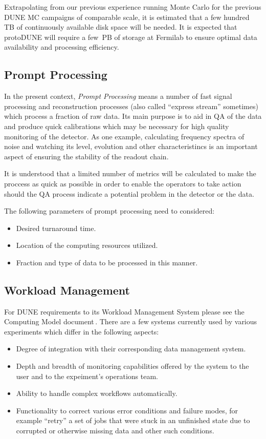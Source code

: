 Extrapolating from our previous experience running Monte Carlo for the previous DUNE MC campaigns of comparable scale,
it is estimated that  a few hundred TB of continuously available disk space will be needed. It is expected that protoDUNE will require
a few~PB of storage at Fermilab to ensure optimal data availability and  processing efficiency. 

\subsection{Prompt Processing}
\label{sec:prompt_processing}
In the present context, \textit{Prompt Processing} means a number of fast signal processing and reconstruction processes
(also called ``express stream'' sometimes) which process a fraction of raw data. Its main purpose is to aid in QA of the data
and produce quick calibrations which may be necessary for high quality monitoring of the detector. As one example,
calculating frequency spectra of noise and watching its level, evolution and other characteristincs is an important aspect of ensuring
the stability of the readout chain.

It is understood
that a limited number of metrics will be calculated to make the proccess as quick as possible in order to enable
the operators to take action should the QA process indicate a potential problem in the detector or the data.

The following parameters of prompt processing need to considered:
\begin{itemize}
\item Desired turnaround time.
\item Location of the computing resources utilized.
\item Fraction and type of data to be processed in this manner.
\end{itemize}

\subsection{Workload Management}
\label{sec:dune-wms}
For DUNE requirements to its Workload Management System please see the Computing Model document\,\cite{dune_computing_model}.
There are a few systems currently used by various experiments which
differ in the following aspects:
\begin{itemize}

\item Degree of integration with their corresponding data management system.

\item Depth and breadth of monitoring capabilities offered by the system to the user and to the expeiment's operations team.

\item Ability to handle complex workflows automatically.

\item Functionality to correct various error conditions and failure modes, for example ``retry'' a set of jobs that were stuck in an unfinished state
due to corrupted or otherwise missing data and other such conditions.

\end{itemize}

